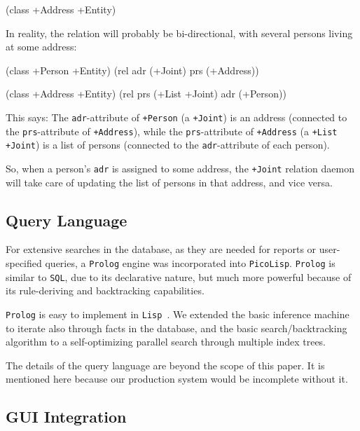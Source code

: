 \begin{wideverbatim}
(class +Address +Entity)
\end{wideverbatim}

In reality, the relation will probably be bi-directional, with several
persons living at some address:


\begin{wideverbatim}
(class +Person +Entity)
(rel adr (+Joint) prs (+Address))

(class +Address +Entity)
(rel prs (+List +Joint) adr (+Person))
\end{wideverbatim}

This says: The \texttt{adr}-attribute of \texttt{+Person} (a \texttt{+Joint}) is an address
(connected to the \texttt{prs}-attribute of \texttt{+Address}), while the
\texttt{prs}-attribute of \texttt{+Address} (a \texttt{+List +Joint}) is a list of persons
(connected to the \texttt{adr}-attribute of each person).

So, when a person's \texttt{adr} is assigned to some address, the \texttt{+Joint}
relation daemon will take care of updating the list of persons in that
address, and vice versa.

\subsection{Query Language}
\label{sec:ul-query-language}


For extensive searches in the database, as they are needed for reports
or user-specified queries, a \texttt{Prolog} engine was incorporated into
\texttt{PicoLisp}. \texttt{Prolog} is similar to \texttt{SQL}, due to its declarative nature,
but much more powerful because of its rule-deriving and backtracking
capabilities.

\texttt{Prolog} is easy to implement in \texttt{Lisp}~\cite{campbell}.
We extended the basic inference machine to iterate also through facts
in the database, and the basic search/backtracking algorithm to a
self-optimizing parallel search through multiple index trees.

The details of the query language are beyond the scope of this paper. It
is mentioned here because our production system would be incomplete
without it.

 
\subsection{GUI Integration}
\label{sec:ul-gui-integration}

